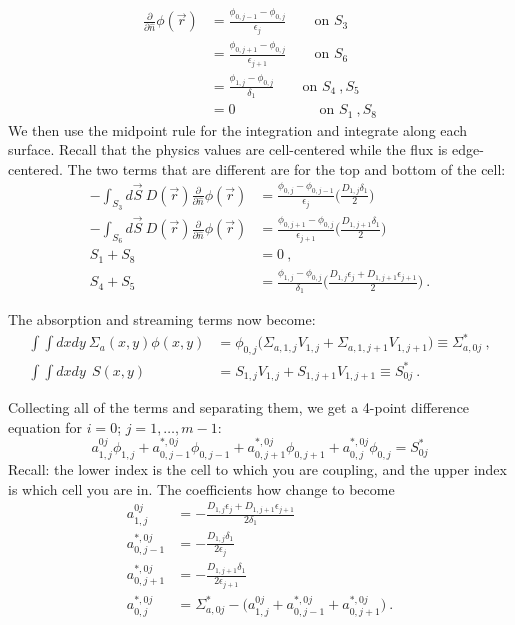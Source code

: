 \documentclass[12pt]{article}
\begin{document}
\begin{align}
\frac{\partial}{\partial \hat{n}}\phi(\vec{r}) &= \frac{\phi_{0,j-1} - \phi_{0,j}}{\epsilon_j} \qquad \text{on } S_3 \nonumber \\
%
&= \frac{\phi_{0,j+1} - \phi_{0,j}}{\epsilon_{j+1}} \qquad \text{on } S_6 \nonumber \\
%
&= \frac{\phi_{1,j} - \phi_{0,j}}{\delta_{1}} \qquad \text{on } S_4 \:, S_5 \nonumber \\
%
&= 0 \qquad \qquad \qquad \text{on } S_1 \:, S_8 \nonumber 
\end{align}
%
We then use the midpoint rule for the integration and integrate along each surface. Recall that the physics values are cell-centered while the flux is edge-centered. The two terms that are different are for the top and bottom of the cell:
%
\begin{align*}
- \int_{S_3} d\vec{S} \:D(\vec{r})\frac{\partial}{\partial \hat{n}}\phi(\vec{r}) &= \frac{\phi_{0,j} - \phi_{0,j-1}}{\epsilon_{j}} \biggl(\frac{D_{1,j} \delta_{1}}{2}\biggr) \: \\ 
%
- \int_{S_6} d\vec{S} \:D(\vec{r})\frac{\partial}{\partial \hat{n}}\phi(\vec{r}) &= \frac{\phi_{0,j+1} - \phi_{0,j}}{\epsilon_{j+1}} \biggl(\frac{D_{1,j+1} \delta_{1}}{2}\biggr) \:\\
%
S_1+S_8 &= 0\:,\\
%
S_4+S_5 &= \frac{\phi_{1,j} - \phi_{0,j}}{\delta_{1}} \biggl(\frac{D_{1,j} \epsilon_{j} + D_{1,j+1} \epsilon_{j+1}}{2}\biggr)\:.
\end{align*}

The absorption and streaming terms now become:
\begin{align}
\int \int dx dy\:\Sigma_a(x,y) \phi(x,y) &= \boxed{\phi_{0,j}\bigl(\Sigma_{a,1,j} V_{1,j} + \Sigma_{a,1,j+1} V_{1,j+1} \bigr) \equiv \Sigma^*_{a,0j}}\:, \nonumber \\
%
\int \int dx dy \: \:S(x,y) &= \boxed{S_{1,j} V_{1,j} + S_{1,j+1} V_{1,j+1} \equiv S^*_{0j}}\:. \nonumber
\end{align}

\vspace*{2em}
Collecting all of the terms and separating them, we get a 4-point difference equation for $i=0$; $j=1,\dots,m-1$:
%
\[\boxed{a_{1,j}^{0j}\phi_{1,j} + a_{0,j-1}^{*,0j}\phi_{0,j-1} + a_{0,j+1}^{*,0j}\phi_{0,j+1} +  a_{0,j}^{*,0j}\phi_{0,j} = S^*_{0j}} \]
%
Recall: the lower index is the cell to which you are coupling, and the upper index is which cell you are in. The coefficients how change to become
\begin{align}
a_{1,j}^{0j} &= -\frac{D_{1,j} \epsilon_{j} + D_{1,j+1} \epsilon_{j+1}}{2 \delta_{1}}  \nonumber \\
%
a_{0,j-1}^{*,0j} &= -\frac{D_{1,j} \delta_{1}}{2 \epsilon_{j}}  \nonumber \\
%
a_{0,j+1}^{*,0j} &= -\frac{D_{1,j+1} \delta_{1}}{2 \epsilon_{j+1}}  \nonumber \\
%
a_{0,j}^{*,0j} &= \Sigma^*_{a,0j} - \bigl(a_{1,j}^{0j} + a_{0,j-1}^{*,0j} + a_{0,j+1}^{*,0j} \bigr)
 \:.\nonumber 
\end{align}
\end{document}
